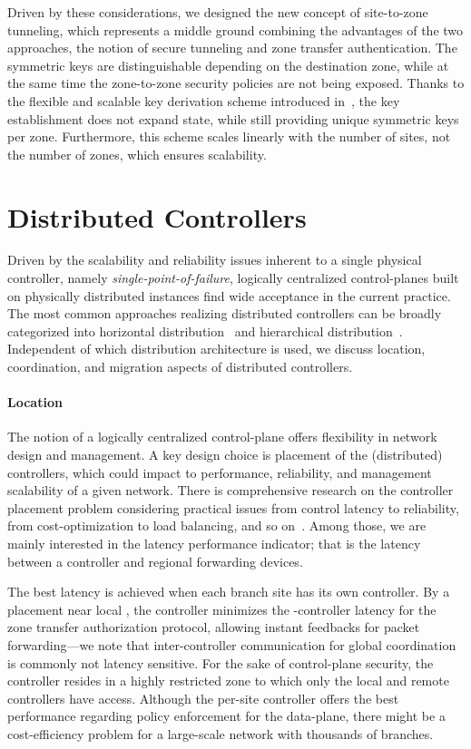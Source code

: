 Driven by these considerations, we designed the new concept of site-to-zone
tunneling, which represents a middle ground combining the advantages of the two
approaches, the notion of secure tunneling and zone transfer authentication. The
symmetric keys are distinguishable depending on the destination zone, while at
the same time the zone-to-zone security policies are not being exposed. Thanks
to the flexible and scalable key derivation scheme introduced
in~\cite{rot2020piskes}, the key establishment does not expand state, while
still providing unique symmetric keys per zone. Furthermore, this scheme scales
linearly with the number of sites, not the number of zones, which ensures
scalability.

\section{Distributed Controllers}
\label{sec:distributedcontroller}
Driven by the scalability and reliability issues inherent to a single physical
controller, namely \textit{single-point-of-failure}, logically centralized
control-planes built on physically distributed instances find wide acceptance in
the current practice. The most common approaches realizing distributed
controllers can be broadly categorized into horizontal
distribution~\cite{berde2014onos,medved2014opendaylight} and hierarchical
distribution~\cite{hassas2012kandoo,yap2017taking}. Independent of which
distribution architecture is used, we discuss location, coordination, and
migration aspects of distributed controllers.

\paragraph{Location}
The notion of a logically centralized control-plane offers flexibility in
network design and management. A key design choice is placement of the
(distributed) controllers, which could impact to performance, reliability, and
management scalability of a given network. There is comprehensive research on
the controller placement problem considering practical issues from control
latency to reliability, from cost-optimization to load balancing, and so
on~\cite{das2019survey,zhang2017role,he2019toward}. Among those, we are mainly
interested in the latency performance indicator; that is the latency between a
controller and regional forwarding devices.

The best latency is achieved when each branch site has its own controller. By a
placement near local \tps, the controller minimizes the \tp-controller latency
for the zone transfer authorization protocol, allowing instant feedbacks for
packet forwarding---we note that inter-controller communication for global
coordination is commonly not latency sensitive. For the sake of control-plane
security, the controller resides in a highly restricted zone to which only the
local \tps and remote controllers have access. Although the per-site controller
offers the best performance regarding policy enforcement for the data-plane,
there might be a cost-efficiency problem for a large-scale network with
thousands of branches.

